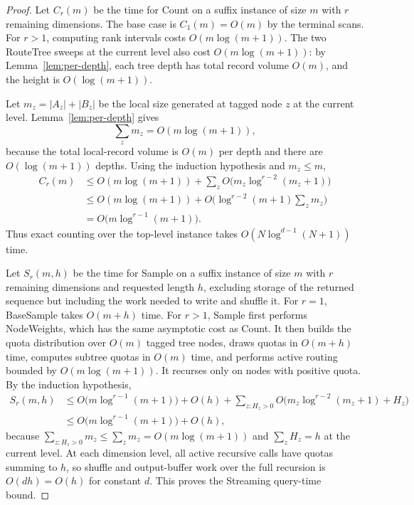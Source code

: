 \documentclass[11pt]{article}
\theoremstyle{definition}
\begin{document}
\begin{proof}
Let $C_r(m)$ be the time for Count on a suffix instance of size $m$ with $r$ remaining dimensions.  The base case is $C_1(m)=O(m)$ by the terminal scans.  For $r>1$, computing rank intervals costs $O(m\log(m+1))$.  The two RouteTree sweeps at the current level also cost $O(m\log(m+1))$: by Lemma~\ref{lem:per-depth}, each tree depth has total record volume $O(m)$, and the height is $O(\log(m+1))$.

Let $m_z=|A_z|+|B_z|$ be the local size generated at tagged node $z$ at the current level.  Lemma~\ref{lem:per-depth} gives
\[
  \sum_z m_z=O(m\log(m+1)),
\]
because the total local-record volume is $O(m)$ per depth and there are $O(\log(m+1))$ depths.  Using the induction hypothesis and $m_z\le m$,
\[
\begin{aligned}
  C_r(m)
  &\le O(m\log(m+1))+
      \sum_z O\bigl(m_z\log^{r-2}(m_z+1)\bigr) \\
  &\le O(m\log(m+1))+
      O\bigl(\log^{r-2}(m+1)\sum_zm_z\bigr) \\
  &=O\bigl(m\log^{r-1}(m+1)\bigr).
\end{aligned}
\]
Thus exact counting over the top-level instance takes $O(N\log^{d-1}(N+1))$ time.

Let $S_r(m,h)$ be the time for Sample on a suffix instance of size $m$ with $r$ remaining dimensions and requested length $h$, excluding storage of the returned sequence but including the work needed to write and shuffle it.  For $r=1$, BaseSample takes $O(m+h)$ time.  For $r>1$, Sample first performs NodeWeights, which has the same asymptotic cost as Count.  It then builds the quota distribution over $O(m)$ tagged tree nodes, draws quotas in $O(m+h)$ time, computes subtree quotas in $O(m)$ time, and performs active routing bounded by $O(m\log(m+1))$.  It recurses only on nodes with positive quota.  By the induction hypothesis,
\[
\begin{aligned}
  S_r(m,h)
  &\le O\bigl(m\log^{r-1}(m+1)\bigr)+O(h)
     +\sum_{z:H_z>0}O\bigl(m_z\log^{r-2}(m_z+1)+H_z\bigr) \\
  &\le O\bigl(m\log^{r-1}(m+1)\bigr)+O(h),
\end{aligned}
\]
because $\sum_{z:H_z>0}m_z\le\sum_zm_z=O(m\log(m+1))$ and $\sum_zH_z=h$ at the current level.  At each dimension level, all active recursive calls have quotas summing to $h$, so shuffle and output-buffer work over the full recursion is $O(dh)=O(h)$ for constant $d$.  This proves the Streaming query-time bound.


\end{proof}
\end{document}

